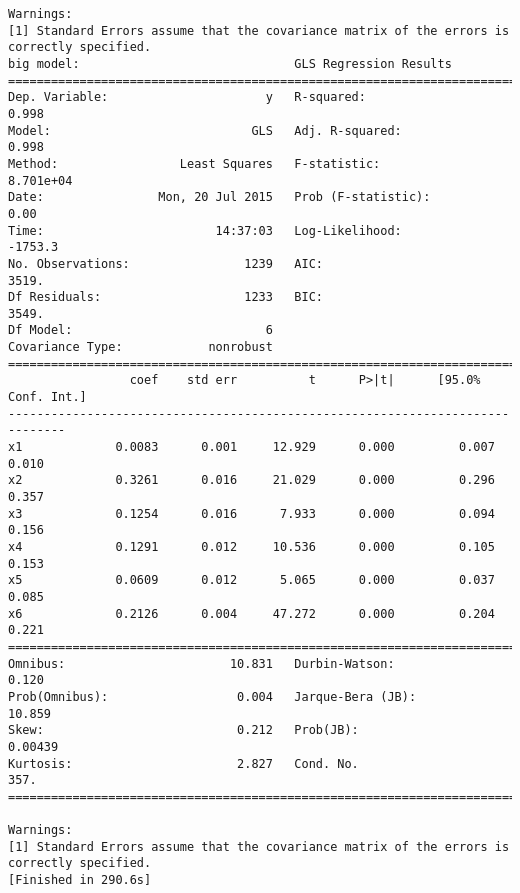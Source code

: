\documentclass{article}
\begin{document}
\begin{verbatim}
Warnings:
[1] Standard Errors assume that the covariance matrix of the errors is correctly specified.
big model:                              GLS Regression Results                            
==============================================================================
Dep. Variable:                      y   R-squared:                       0.998
Model:                            GLS   Adj. R-squared:                  0.998
Method:                 Least Squares   F-statistic:                 8.701e+04
Date:                Mon, 20 Jul 2015   Prob (F-statistic):               0.00
Time:                        14:37:03   Log-Likelihood:                -1753.3
No. Observations:                1239   AIC:                             3519.
Df Residuals:                    1233   BIC:                             3549.
Df Model:                           6                                         
Covariance Type:            nonrobust                                         
==============================================================================
                 coef    std err          t      P>|t|      [95.0% Conf. Int.]
------------------------------------------------------------------------------
x1             0.0083      0.001     12.929      0.000         0.007     0.010
x2             0.3261      0.016     21.029      0.000         0.296     0.357
x3             0.1254      0.016      7.933      0.000         0.094     0.156
x4             0.1291      0.012     10.536      0.000         0.105     0.153
x5             0.0609      0.012      5.065      0.000         0.037     0.085
x6             0.2126      0.004     47.272      0.000         0.204     0.221
==============================================================================
Omnibus:                       10.831   Durbin-Watson:                   0.120
Prob(Omnibus):                  0.004   Jarque-Bera (JB):               10.859
Skew:                           0.212   Prob(JB):                      0.00439
Kurtosis:                       2.827   Cond. No.                         357.
==============================================================================

Warnings:
[1] Standard Errors assume that the covariance matrix of the errors is correctly specified.
[Finished in 290.6s]
\end{verbatim}
\end{document}
